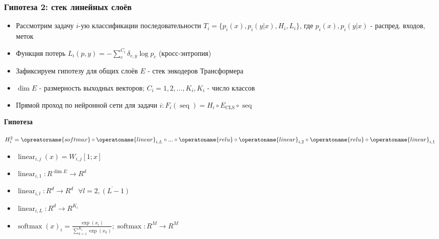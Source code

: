 \documentclass[aspectratio=169]{beamer}
\begin{document}
\begin{frame}
	\frametitle{Гипотеза 2: стек линейных слоёв}
	\begin{itemize}
		\item Рассмотрим задачу $i$-ую классификации последовательности $T_i = \{p_i(x), p_i(y | x), H_i, L_i\}$, где $p_i(x), p_i(y|x)$ - распред. входов, меток
		\item Функция потерь $L_i(p, y) = - \sum_{c}^{C_{i}} \delta_{c, y} \log p_c$ (кросс-энтропия)
		\item Зафиксируем гипотезу для общих слоёв $E$ - стек энкодеров Трансформера
		\item $\dim E$ - размерность выходных векторов; $C_i = {1, 2, ..., K_i}, K_i$ - число классов
		\item Прямой проход по нейронной сети для задачи $i: F_i(\operatorname{seq}) = H_i \circ E_{\operatorname{CLS}} \circ \operatorname{seq}$
	\end{itemize}

	\textbf{Гипотеза}

	$H_i^2 = \opreatorname{softmax} \circ \operatoname{linear}_{i, L}  \circ ... \circ \operatoname{relu} \circ \operatoname{linear}_{i, 2} \circ \operatoname{relu} \circ \operatoname{linear}_{i, 1}$
	
	\begin{itemize}
		\item $\operatorname{linear}_{i, j}(x) = W_{i, j}[1; x]$
		\item $\operatorname{linear}_{i, 1} : R ^ {\dim E} \rightarrow R ^ {d}$
		\item $\operatorname{linear}_{i, l} : R ^ {d} \rightarrow R ^ {d} \text{ } \forall l = \overline{2, (L-1)}$
		\item $\operatorname{linear}_{i, L} : R ^ {d} \rightarrow R ^ {K_i}$
		\item $\operatorname{softmax}(x)_i = \frac{\exp(x_i)}{\sum_{k = 1}^{K_i} \exp(x_k)}; \operatorname{softmax} : R ^ {M} \rightarrow R ^ {M}$
	\end{itemize}
\end{frame}
\end{document}
